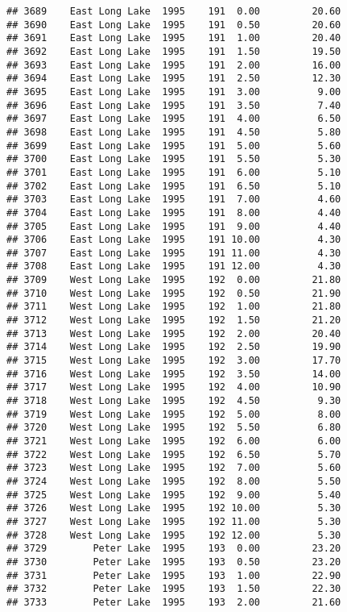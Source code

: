 \documentclass[
]{article}
\begin{document}
\begin{verbatim}
## 3689    East Long Lake  1995    191  0.00         20.60
## 3690    East Long Lake  1995    191  0.50         20.60
## 3691    East Long Lake  1995    191  1.00         20.40
## 3692    East Long Lake  1995    191  1.50         19.50
## 3693    East Long Lake  1995    191  2.00         16.00
## 3694    East Long Lake  1995    191  2.50         12.30
## 3695    East Long Lake  1995    191  3.00          9.00
## 3696    East Long Lake  1995    191  3.50          7.40
## 3697    East Long Lake  1995    191  4.00          6.50
## 3698    East Long Lake  1995    191  4.50          5.80
## 3699    East Long Lake  1995    191  5.00          5.60
## 3700    East Long Lake  1995    191  5.50          5.30
## 3701    East Long Lake  1995    191  6.00          5.10
## 3702    East Long Lake  1995    191  6.50          5.10
## 3703    East Long Lake  1995    191  7.00          4.60
## 3704    East Long Lake  1995    191  8.00          4.40
## 3705    East Long Lake  1995    191  9.00          4.40
## 3706    East Long Lake  1995    191 10.00          4.30
## 3707    East Long Lake  1995    191 11.00          4.30
## 3708    East Long Lake  1995    191 12.00          4.30
## 3709    West Long Lake  1995    192  0.00         21.80
## 3710    West Long Lake  1995    192  0.50         21.90
## 3711    West Long Lake  1995    192  1.00         21.80
## 3712    West Long Lake  1995    192  1.50         21.20
## 3713    West Long Lake  1995    192  2.00         20.40
## 3714    West Long Lake  1995    192  2.50         19.90
## 3715    West Long Lake  1995    192  3.00         17.70
## 3716    West Long Lake  1995    192  3.50         14.00
## 3717    West Long Lake  1995    192  4.00         10.90
## 3718    West Long Lake  1995    192  4.50          9.30
## 3719    West Long Lake  1995    192  5.00          8.00
## 3720    West Long Lake  1995    192  5.50          6.80
## 3721    West Long Lake  1995    192  6.00          6.00
## 3722    West Long Lake  1995    192  6.50          5.70
## 3723    West Long Lake  1995    192  7.00          5.60
## 3724    West Long Lake  1995    192  8.00          5.50
## 3725    West Long Lake  1995    192  9.00          5.40
## 3726    West Long Lake  1995    192 10.00          5.30
## 3727    West Long Lake  1995    192 11.00          5.30
## 3728    West Long Lake  1995    192 12.00          5.30
## 3729        Peter Lake  1995    193  0.00         23.20
## 3730        Peter Lake  1995    193  0.50         23.20
## 3731        Peter Lake  1995    193  1.00         22.90
## 3732        Peter Lake  1995    193  1.50         22.30
## 3733        Peter Lake  1995    193  2.00         21.60

\end{verbatim}
\end{document}
